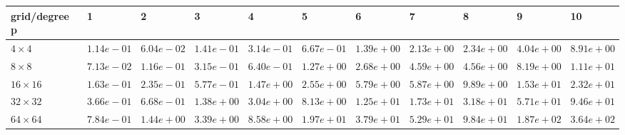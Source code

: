 \begin{tabular}{lllllllllll}
\hline
 grid/degree p   & 1          & 2          & 3          & 4          & 5          & 6          & 7          & 8          & 9          & 10         \\
\hline
 $4 \times 4$    & $1.14e-01$ & $6.04e-02$ & $1.41e-01$ & $3.14e-01$ & $6.67e-01$ & $1.39e+00$ & $2.13e+00$ & $2.34e+00$ & $4.04e+00$ & $8.91e+00$ \\
 $8 \times 8$    & $7.13e-02$ & $1.16e-01$ & $3.15e-01$ & $6.40e-01$ & $1.27e+00$ & $2.68e+00$ & $4.59e+00$ & $4.56e+00$ & $8.19e+00$ & $1.11e+01$ \\
 $16 \times 16$  & $1.63e-01$ & $2.35e-01$ & $5.77e-01$ & $1.47e+00$ & $2.55e+00$ & $5.79e+00$ & $5.87e+00$ & $9.89e+00$ & $1.53e+01$ & $2.32e+01$ \\
 $32 \times 32$  & $3.66e-01$ & $6.68e-01$ & $1.38e+00$ & $3.04e+00$ & $8.13e+00$ & $1.25e+01$ & $1.73e+01$ & $3.18e+01$ & $5.71e+01$ & $9.46e+01$ \\
 $64 \times 64$  & $7.84e-01$ & $1.44e+00$ & $3.39e+00$ & $8.58e+00$ & $1.97e+01$ & $3.79e+01$ & $5.29e+01$ & $9.84e+01$ & $1.87e+02$ & $3.64e+02$ \\
\hline
\end{tabular}
